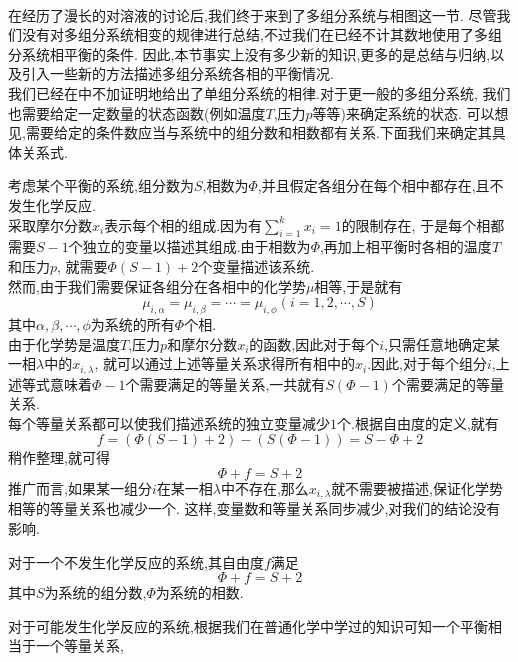 \documentclass{ctexart}
\begin{document}
\pagestyle{plain}
\noindent{}\vspace{15pt}\\
\indent 在经历了漫长的对溶液的讨论后,我们终于来到了多组分系统与相图这一节.%
尽管我们没有对多组分系统相变的规律进行总结,不过我们在已经不计其数地使用了多组分系统相平衡的条件.%
因此,本节事实上没有多少新的知识,更多的是总结与归纳,以及引入一些新的方法描述多组分系统各相的平衡情况.\vspace{12pt}\\
\indent 我们已经在中不加证明地给出了单组分系统的相律.对于更一般的多组分系统,%
我们也需要给定一定数量的状态函数(例如温度$T$,压力$p$等等)来确定系统的状态.%
可以想见,需要给定的条件数应当与系统中的组分数和相数都有关系.下面我们来确定其具体关系式.
\begin{derivation}
    考虑某个平衡的系统,组分数为$S$,相数为$\varPhi$,并且假定各组分在每个相中都存在,且不发生化学反应.\\
    采取摩尔分数$x_i$表示每个相的组成.因为有$\displaystyle\sum_{i=1}^{k}x_i=1$的限制存在,%
    于是每个相都需要$S-1$个独立的变量以描述其组成.由于相数为$\varPhi$,再加上相平衡时各相的温度$T$和压力$p$,%
    就需要$\varPhi(S-1)+2$个变量描述该系统.\\
    然而,由于我们需要保证各组分在各相中的化学势$\mu$相等,于是就有
    \[\mu_{i,\alpha}=\mu_{i,\beta}=\cdots=\mu_{i,\phi}(i=1,2,\cdots,S)\]
    其中$\alpha,\beta,\cdots,\phi$为系统的所有$\varPhi$个相.\\
    由于化学势是温度$T$,压力$p$和摩尔分数$x_i$的函数,因此对于每个$i$,只需任意地确定某一相$\lambda$中的$x_{i,\lambda}$,%
    就可以通过上述等量关系求得所有相中的$x_i$.因此,对于每个组分$i$,上述等式意味着$\varPhi-1$个需要满足的等量关系,一共就有$S(\varPhi-1)$个需要满足的等量关系.\\
    每个等量关系都可以使我们描述系统的独立变量减少$1$个.根据自由度的定义,就有
    \[f=\left(\varPhi(S-1)+2\right)-\left(S(\varPhi-1)\right)=S-\varPhi+2\]
    稍作整理,就可得
    \[\varPhi+f=S+2\]
    推广而言,如果某一组分$i$在某一相$\lambda$中不存在,那么$x_{i,\lambda}$就不需要被描述,保证化学势相等的等量关系也减少一个.%
    这样,变量数和等量关系同步减少,对我们的结论没有影响.
\end{derivation}
\begin{theorem}[4D.1.1 简单多组分系统的相律]
    对于一个不发生化学反应的系统,其自由度$f$满足
    \[\varPhi+f=S+2\]
    其中$S$为系统的组分数,$\varPhi$为系统的相数.
\end{theorem}
对于可能发生化学反应的系统,根据我们在普通化学中学过的知识可知一个平衡相当于一个等量关系,%
\end{document}
